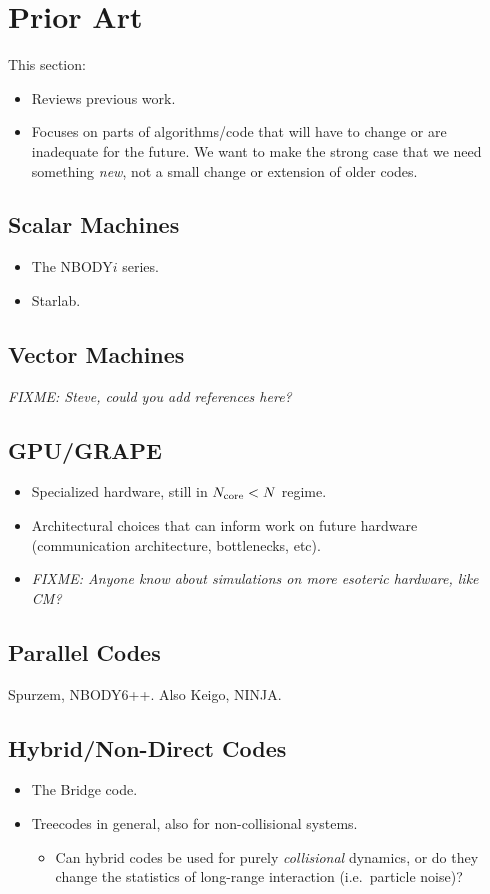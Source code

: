 \documentclass[5p,authoryear]{elsarticle}
\newcommand{\Ncore}{N_{\textnormal{core}}}
\newcommand{\fixme}[1]{\emph{FIXME: #1}}
\begin{document}
\section{Prior Art}

This section:
\begin{itemize}
\item Reviews previous work.
\item Focuses on parts of algorithms/code that will have to change or
  are inadequate for the future.  We want to make the strong case that
  we need something \emph{new}, not a small change or extension of
  older codes.
\end{itemize}

\subsection{Scalar Machines}
\begin{itemize}
\item The NBODY$i$ series.
\item Starlab.
\end{itemize}

\subsection{Vector Machines}

\fixme{Steve, could you add references here?}

\subsection{GPU/GRAPE}
\begin{itemize}
\item Specialized hardware, still in $\Ncore < N$ regime.
\item Architectural choices that can inform work on future hardware
  (communication architecture, bottlenecks, etc).
\item \fixme{Anyone know about simulations on more esoteric hardware,
    like CM?} \citet{Makino1989}
\end{itemize}

\subsection{Parallel Codes}

Spurzem, NBODY6++.  Also Keigo, NINJA.

\subsection{Hybrid/Non-Direct Codes}
\begin{itemize}
\item The Bridge code.
\item Treecodes in general, also for non-collisional systems.
  \begin{itemize}
  \item Can hybrid codes be used for purely \emph{collisional}
    dynamics, or do they change the statistics of long-range
    interaction (i.e.\ particle noise)?
  \end{itemize}
\end{itemize}
\end{document}
